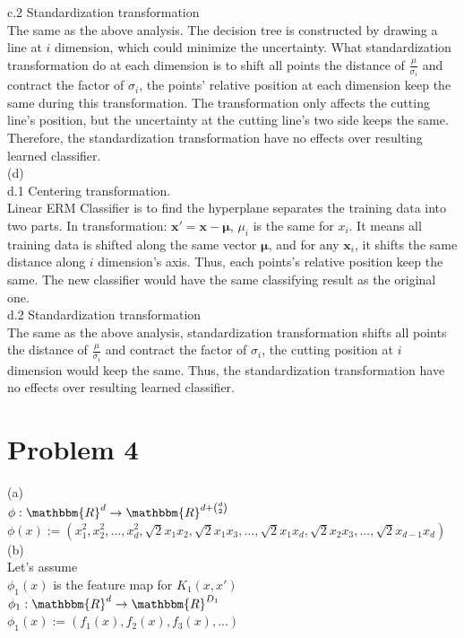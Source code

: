 \documentclass[twoside,11pt]{homework}
\begin{document}
c.2 Standardization transformation \\
The same as the above analysis. The decision tree is constructed by drawing a line at $i$ dimension, which could minimize the uncertainty. What standardization transformation do at each dimension is to shift all points the distance of $\frac{\mu}{\sigma_i}$ and contract the factor of $\sigma_i$, the points' relative position at each dimension keep the same during this transformation. The transformation only affects the cutting line's position, but the uncertainty at the cutting line's two side keeps the same. Therefore, the standardization transformation have no effects over resulting learned classifier.\\

(d)\\
d.1 Centering transformation. \\
Linear ERM Classifier is to find the hyperplane separates the training data into two parts.  In transformation: $\pmb x' = \pmb{x} - \pmb\mu$, $\mu_i$ is the same for $x_i$. It means all training data is shifted along the same vector $\pmb\mu$, and for any $\pmb{x}_i$, it shifts the same distance along $i$ dimension's axis. Thus, each points's relative position keep the same. The new classifier would have the same classifying result as the original one. \\

d.2 Standardization transformation \\
The same as the above analysis, standardization transformation shifts all points the distance of $\frac{\mu}{\sigma_i}$ and contract the factor of $\sigma_i$, the cutting position at $i$ dimension would keep the same. Thus, the standardization transformation have no effects over resulting learned classifier.

 
\section*{Problem 4}
(a)\\
$\phi : \mathbbm{R}^d \to  \mathbbm{R}^{d+\binom{d}{2}}$\\
$\phi(x) := (x_1^2, x_2^2, ..., x_d^2, \sqrt{2}x_1x_2, \sqrt{2}x_1x_3, ..., \sqrt{2}x_1x_d, \sqrt{2}x_2x_3, ...,  \sqrt{2}x_{d-1}x_d)$\\


(b)\\
Let's assume \\

$\phi_1 (x)$ is the feature map for $K_1(x, x')$ \\
$\phi_1 : \mathbbm{R}^d \to  \mathbbm{R}^{D_1}$\\
$\phi_1 (x) := (f_1(x), f_2(x), f_3(x), ...)$\\
\end{document}
